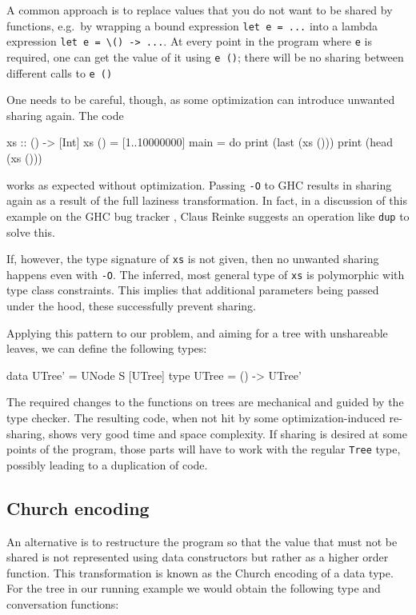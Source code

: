 \documentclass[preprint]{sigplanconf}
\theoremstyle{nonumberplain}
\newcommand{\li}{\lstinline[style=Haskell]}
\newcommand{\ci}{\lstinline[style=Cmm]}
\begin{document}
A common approach is to replace values that you do not want to be shared by functions, e.g.\ by wrapping a bound expression \li-let e = ...- into a lambda expression \li!let e = \() -> ...!. At every point in the program where \li-e- is required, one can get the value of it using \li-e ()-; there will be no sharing between different calls to \li-e ()-

One needs to be careful, though, as some optimization can introduce unwanted sharing again. The code
\begin{haskell}
xs :: () -> [Int]
xs () = [1..10000000]
main = do
    print (last (xs ()))
    print (head (xs ()))
\end{haskell}
works as expected without optimization. Passing  \ci!-O! to GHC results in sharing again as a result of the full laziness transformation. In fact, in a discussion of this example on the GHC bug tracker \citep{spaceleakbug}, Claus Reinke suggests an operation like \li-dup- to solve this.

If, however, the type signature of \li-xs- is not given, then no unwanted sharing happens even with \ci!-O!. The inferred, most general type of \li-xs- is polymorphic with type class constraints. This implies that additional parameters being passed under the hood, these successfully prevent sharing.

Applying this pattern to our problem, and aiming for a tree with unshareable leaves, we can define the following types:
\begin{haskell}
data UTree' = UNode S [UTree]
type UTree = () -> UTree'
\end{haskell}
The required changes to the functions on trees are mechanical and guided by the type checker. The resulting code, when not hit by some optimization-induced re-sharing, shows very good time and space complexity. If sharing is desired at some points of the program, those parts will have to work with the regular \li-Tree- type, possibly leading to a duplication of code.

\subsection{Church encoding}

An alternative is to restructure the program so that the value that must not be shared is not represented using data constructors but rather as a higher order function. This transformation is known as the Church encoding of a data type. For the tree in our running example we would obtain the following type and conversation functions:
\end{document}
